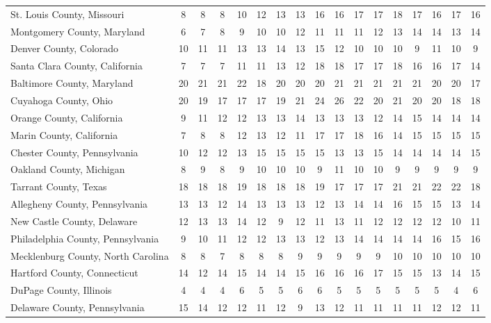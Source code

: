 \begin{landscape}
\begin{longtable}{lcccccccccccccccc}
	St. Louis County, Missouri & 8 & 8 & 8 & 10 & 12 & 13 & 13 & 16 & 16 & 17 & 17 & 18 & 17 & 16 & 17 & 16 \\
	Montgomery County, Maryland & 6 & 7 & 8 & 9 & 10 & 10 & 12 & 11 & 11 & 11 & 12 & 13 & 14 & 14 & 13 & 14 \\
	Denver County, Colorado & 10 & 11 & 11 & 13 & 13 & 14 & 13 & 15 & 12 & 10 & 10 & 10 & 9 & 11 & 10 & 9 \\
	Santa Clara County, California & 7 & 7 & 7 & 11 & 11 & 13 & 12 & 18 & 18 & 17 & 17 & 18 & 16 & 16 & 17 & 14 \\
	Baltimore County, Maryland & 20 & 21 & 21 & 22 & 18 & 20 & 20 & 20 & 21 & 21 & 21 & 21 & 21 & 20 & 20 & 17 \\
	Cuyahoga County, Ohio & 20 & 19 & 17 & 17 & 17 & 19 & 21 & 24 & 26 & 22 & 20 & 21 & 20 & 20 & 18 & 18 \\
	Orange County, California & 9 & 11 & 12 & 12 & 13 & 13 & 14 & 13 & 13 & 13 & 12 & 14 & 15 & 14 & 14 & 14 \\
	Marin County, California & 7 & 8 & 8 & 12 & 13 & 12 & 11 & 17 & 17 & 18 & 16 & 14 & 15 & 15 & 15 & 15 \\
	Chester County, Pennsylvania & 10 & 12 & 12 & 13 & 15 & 15 & 15 & 15 & 13 & 13 & 15 & 14 & 14 & 14 & 14 & 15 \\
	Oakland County, Michigan & 8 & 9 & 8 & 9 & 10 & 10 & 10 & 9 & 11 & 10 & 10 & 9 & 9 & 9 & 9 & 9 \\
	Tarrant County, Texas & 18 & 18 & 18 & 19 & 18 & 18 & 18 & 19 & 17 & 17 & 17 & 21 & 21 & 22 & 22 & 18 \\
	Allegheny County, Pennsylvania & 13 & 13 & 12 & 14 & 13 & 13 & 13 & 12 & 13 & 14 & 14 & 16 & 15 & 15 & 13 & 14 \\
	New Castle County, Delaware & 12 & 13 & 13 & 14 & 12 & 9 & 12 & 11 & 13 & 11 & 12 & 12 & 12 & 12 & 10 & 11 \\
	Philadelphia County, Pennsylvania & 9 & 10 & 11 & 12 & 12 & 13 & 13 & 12 & 13 & 14 & 14 & 14 & 14 & 16 & 15 & 16 \\
	Mecklenburg County, North Carolina & 8 & 8 & 7 & 8 & 8 & 8 & 9 & 9 & 9 & 9 & 9 & 10 & 10 & 10 & 10 & 10 \\
	Hartford County, Connecticut & 14 & 12 & 14 & 15 & 14 & 14 & 15 & 16 & 16 & 16 & 17 & 15 & 15 & 13 & 14 & 15 \\
	DuPage County, Illinois & 4 & 4 & 4 & 6 & 5 & 5 & 6 & 6 & 5 & 5 & 5 & 5 & 5 & 5 & 4 & 6 \\
	Delaware County, Pennsylvania & 15 & 14 & 12 & 12 & 11 & 12 & 9 & 13 & 12 & 11 & 11 & 11 & 11 & 12 & 12 & 11 \\

\end{longtable}
\end{landscape}
